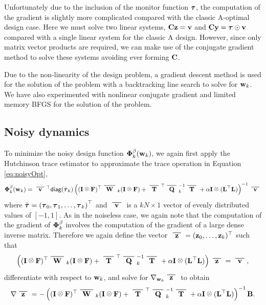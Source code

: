 \documentclass[final,leqno,onefignum,onetabnum]{siamltexmm}
\begin{document}
Unfortunately due to the inclusion of the monitor function ${\boldsymbol \tau}$, the computation of the gradient
is slightly more complicated compared with  the classic A-optimal design case. Here  we must solve two linear systems, ${\bf{C}}{\bf{z}} = {\bf{v}}$ and ${\bf{C}}{\bf{y}} = {\boldsymbol \tau}\odot{\bf{v}}$ compared with a single linear system for the classic A design. However, since only matrix vector products are required, we can make use of the conjugate gradient method to solve these systems avoiding ever forming ${\bf{C}}$. 

Due to the non-linearity of the design problem, a gradient descent method is used for the solution
of the problem with a backtracking line search to solve for ${\bf{w}}_k$.
We have also experimented with nonlinear conjugate gradient and limited memory BFGS for the solution
of the problem.
%
\subsection{Noisy dynamics}
To minimize the noisy design function ${\boldsymbol \Phi}_k^{\beta}({\bf{w}}_k)$, we again first apply the Hutchinson trace estimator to approximate the trace operation in Equation
 \eqref{eq:noisyOpt},
 \begin{align}
\bfPhi_k^{\beta}(\bfw_k) =\vbar^{\top }{\sf diag}(\bar{\bftau}_{k}) \left((\bfI \kronecker \bfF)^{\top}\Wbar_k(\bfI \kronecker \bfF)  +
\Tbar^{\top}\Qbar^{-1}_k\Tbar + \alpha \bfI \kronecker(\LtL)
\right)^{-1}\vbar
\end{align} 
%
where $\bar{{\boldsymbol \tau}} = \left({\boldsymbol \tau}_0,
{\boldsymbol \tau}_1 ,
\hdots,
{\boldsymbol \tau}_k\right)^{\top}$ and  $\vbar$ is a $kN \times 1$ vector of evenly distributed values of $[-1,1]$. 
As in the noiseless case, we again note that the computation of the gradient of ${\boldsymbol \Phi}_k^{\beta}$ involves the computation of the gradient of a large dense inverse matrix. Therefore we again define the vector $\zbar = (\bfz_0,\hdots,\bfz_k)^{\top}$  such that 
%
 \begin{align}
 \left((\bfI \kronecker \bfF)^{\top}\Wbar_k(\bfI \kronecker \bfF)  +
\Tbar^{\top}\Qbar^{-1}_k\Tbar + \alpha \bfI \kronecker(\LtL)
\right)\zbar = \vbar,
\end{align} 
%
differentiate with respect to ${\bf{w}}_k$, and solve for $\nabla_{\bfw_k}\zbar$ to obtain
%
\begin{align}
\nabla\zbar =-\left( (\bfI \kronecker \bfF)^{\top}\Wbar_k(\bfI \kronecker \bfF)  + 
\Tbar^{\top}\Qbar^{-1}_k\Tbar + \alpha \bfI \kronecker(\LtL) \right)^{-1}\bfB.
\end{align}
\end{document}
